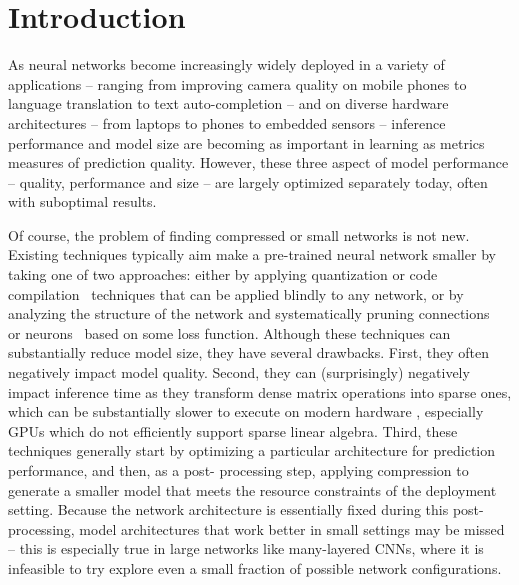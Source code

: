 
\section{Introduction}

As neural networks become increasingly widely deployed in a variety of
applications  -- ranging from improving camera quality on mobile phones
\cite{googleapple} to language translation \cite{languagetranslation} to text
auto-completion \cite{autocomplete} -- and on diverse hardware architectures
-- from laptops to phones to embedded sensors --  inference performance and
model size are becoming as important in learning as metrics measures of
prediction quality. However, these three aspect of model performance --
quality, performance and size -- are largely optimized separately today, often
with suboptimal results.

Of course, the problem of finding compressed or small networks is not new.
Existing techniques typically aim make a pre-trained neural network smaller
\cite{something1,something2} by taking one of two approaches:  either by
applying quantization \cite{quant} or code compilation~\cite{something}
techniques that can be applied blindly to any network, or by analyzing the
structure of the network and systematically pruning
connections~\cite{han2015deepcompression,Cun} or neurons~\cite{XXX}
based on some loss function.  Although these techniques can substantially
reduce model size, they have several drawbacks.  First, they often negatively
impact model quality.  Second, they can (surprisingly) negatively impact
inference time as they transform dense matrix operations into sparse ones,
which can be substantially slower to execute on modern hardware
\cite{something}, especially GPUs which do not efficiently support sparse
linear algebra.  Third, these techniques generally start by optimizing a
particular architecture for prediction performance, and then, as a post-
processing step, applying compression  to generate a smaller model that meets the
resource constraints of the deployment setting.  Because the network
architecture is essentially fixed during this post-processing,   model architectures
that work better in small settings may be missed -- this is especially true in
large networks like many-layered CNNs,  where it is infeasible to try explore
even a small fraction of possible network configurations.



